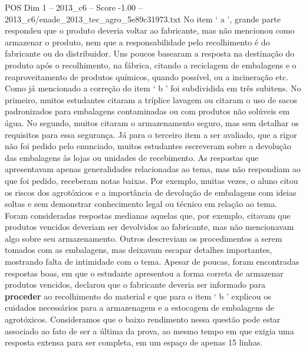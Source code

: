 \begin{textsample}{POS Dim 1 – 2013\_c6 – Score -1.00 – 2013\_c6/enade\_2013\_tec\_agro\_5e89c31973.txt}
No item ‘ a ’, grande parte respondeu que o produto deveria voltar ao fabricante, mas não mencionou como armazenar o produto, nem que a responsabilidade pelo recolhimento é do fabricante ou do distribuidor.
Uns poucos basearam a resposta na destinação do produto após o recolhimento, na fábrica, citando a reciclagem de embalagens e o reaproveitamento de produtos químicos, quando possível, ou a incineração etc.
Como já mencionado a correção do item ‘ b ’ foi subdividida em três subitens.
No primeiro, muitos estudantes citaram a tríplice lavagem ou citaram o uso de sacos padronizados para embalagens contaminadas ou com produtos não solúveis em água.
No segundo, muitos citaram o armazenamento seguro, mas sem detalhar os requisitos para essa segurança.
Já para o terceiro item a ser avaliado, que a rigor não foi pedido pelo enunciado, muitos estudantes escreveram sobre a devolução das embalagens às lojas ou unidades de recebimento.
As respostas que apresentavam apenas generalidades relacionadas ao tema, mas não respondiam ao que foi pedido, receberam notas baixas.
Por exemplo, muitas vezes, o aluno citou os riscos dos agrotóxicos e a importância de devolução de embalagens com ideias soltas e sem demonstrar conhecimento legal ou técnico em relação ao tema.
Foram consideradas respostas medianas aquelas que, por exemplo, citavam que produtos vencidos deveriam ser devolvidos ao fabricante, mas não mencionavam algo sobre seu armazenamento.
Outros descreviam os procedimentos a serem tomados com as embalagens, mas deixavam escapar detalhes importantes, mostrando falta de intimidade com o tema.
Apesar de poucas, foram encontradas respostas boas, em que o estudante apresentou a forma correta de armazenar produtos vencidos, declarou que o fabricante deveria ser informado para \textbf{proceder} ao recolhimento do material e que para o item ‘ b ’ explicou os cuidados necessários para a armazenagem e a estocagem de embalagens de agrotóxicos.
Consideramos que o baixo rendimento nessa questão pode estar associado ao fato de ser a última da prova, ao mesmo tempo em que exigia uma resposta extensa para ser completa, em um espaço de apenas 15 linhas.

\end{textsample}

